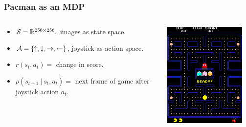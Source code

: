 \begin{frame}
  \frametitle{Pacman as an MDP}
    \begin{columns}
    \begin{column}{0.5\textwidth}
      \begin{itemize}
        \item ${\mathcal S} = \mathbb{R}^{256\times 256},$ images as state space.
        \item ${\mathcal A} = \{\uparrow, \downarrow, \rightarrow, \leftarrow\}$, joystick as action space.
        \item $r(s_t,a_t) = $ change in score.
        \item $\rho(s_{t+1}\ |\ s_t, a_t) = $ next frame of game after joystick action $a_t$.
      \end{itemize}
    \end{column}
    \begin{column}{0.5\textwidth}
    \includegraphics[width=0.9\textwidth]{Pac-man.png}
    \end{column}
  \end{columns}
\end{frame}



